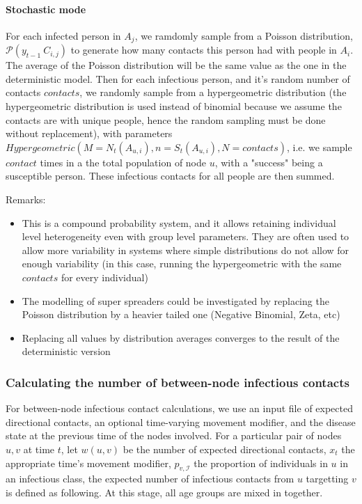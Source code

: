 \documentclass[11pt]{article}
\begin{document}
\paragraph{Stochastic mode}\hfill \break
For each infected person in $A_j$, we ramdomly sample from a Poisson distribution, $\mathcal{P}(y_{t-1}~C_{i,j})$ to generate how many contacts this person had with people in $A_i$. The average of the Poisson distribution will be the same value as the one in the deterministic model. Then for each infectious person, and it's random number of contacts $contacts$, we randomly sample from a hypergeometric distribution (the hypergeometric distribution is used instead of binomial because we assume the contacts are with unique people, hence the random sampling must be done without replacement), with parameters $Hypergeometric(M=N_t(A_{u,i}), n=S_t(A_{u,i}), N=contacts)$, i.e. we sample $contact$ times in a the total population of node $u$, with a "success" being a susceptible person. These infectious contacts for all people are then summed.

Remarks:
\begin{itemize}
\item This is a compound probability system, and it allows retaining individual level heterogeneity even with group level parameters. They are often used to allow more variability in systems where simple distributions do not allow for enough variability (in this case, running the hypergeometric with the same $contacts$ for every individual)
\item The modelling of super spreaders could be investigated by replacing the Poisson distribution by a heavier tailed one (Negative Binomial, Zeta, etc)
\item Replacing all values by distribution averages converges to the result of the deterministic version
\end{itemize}

\subsubsection{Calculating the number of between-node infectious contacts}

For between-node infectious contact calculations, we use an input file of expected directional contacts, an optional time-varying movement modifier, and the disease state at the previous time of the nodes involved.  For a particular pair of nodes $u, v$ at time $t$, let $w(u, v)$ be the number of expected directional contacts, $x_t$ the appropriate time's movement modifier, $p_{v,\mathcal{I}}$ the proportion of individuals in $u$ in an infectious class, the expected number of infectious contacts from $u$ targetting $v$ is defined as following. At this stage, all age groups are mixed in together.
\end{document}
